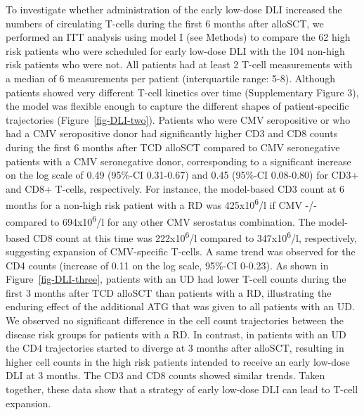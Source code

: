\documentclass[
  letterpaper,
  DIV=11,
  numbers=noendperiod]{scrreprt}
\begin{document}
To investigate whether administration of the early low-dose DLI
increased the numbers of circulating T-cells during the first 6 months
after alloSCT, we performed an ITT analysis using model I (see Methods)
to compare the 62 high risk patients who were scheduled for early
low-dose DLI with the 104 non-high risk patients who were not. All
patients had at least 2 T-cell measurements with a median of 6
measurements per patient (interquartile range: 5-8). Although patients
showed very different T-cell kinetics over time (Supplementary Figure
3), the model was flexible enough to capture the different shapes of
patient-specific trajectories (Figure~\ref{fig-DLI-two}). Patients who
were CMV seropositive or who had a CMV seropositive donor had
significantly higher CD3 and CD8 counts during the first 6 months after
TCD alloSCT compared to CMV seronegative patients with a CMV
seronegative donor, corresponding to a significant increase on the log
scale of 0.49 (95\%-CI 0.31-0.67) and 0.45 (95\%-CI 0.08-0.80) for CD3+
and CD8+ T-cells, respectively. For instance, the model-based CD3 count
at 6 months for a non-high risk patient with a RD was
425x10\textsuperscript{6}/l if CMV -/- compared to
694x10\textsuperscript{6}/l for any other CMV serostatus combination.
The model-based CD8 count at this time was 222x10\textsuperscript{6}/l
compared to 347x10\textsuperscript{6}/l, respectively, suggesting
expansion of CMV-specific T-cells. A same trend was observed for the CD4
counts (increase of 0.11 on the log scale, 95\%-CI 0-0.23). As shown in
Figure~\ref{fig-DLI-three}, patients with an UD had lower T-cell counts
during the first 3 months after TCD alloSCT than patients with a RD,
illustrating the enduring effect of the additional ATG that was given to
all patients with an UD. We observed no significant difference in the
cell count trajectories between the disease risk groups for patients
with a RD. In contrast, in patients with an UD the CD4 trajectories
started to diverge at 3 months after alloSCT, resulting in higher cell
counts in the high risk patients intended to receive an early low-dose
DLI at 3 months. The CD3 and CD8 counts showed similar trends. Taken
together, these data show that a strategy of early low-dose DLI can lead
to T-cell expansion.
\end{document}
